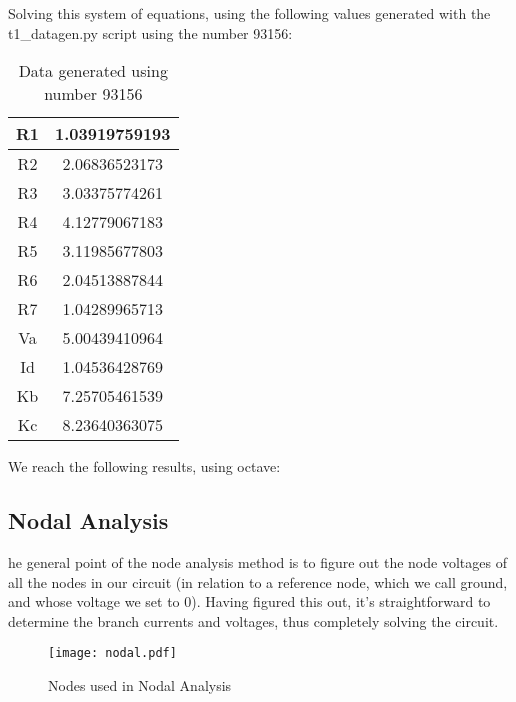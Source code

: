 \vspace{20mm}

Solving this system of equations, using the following values generated with the t1\_datagen.py script using the number 93156:


\begin{table}[H]
  \centering
  \begin{tabular}{ c c }
    R1 & 1.03919759193 \\ 
    \hline
    R2 & 2.06836523173 \\ 
    \hline
    R3 & 3.03375774261 \\ 
    \hline
    R4 & 4.12779067183 \\ 
    \hline
    R5 & 3.11985677803 \\ 
    \hline
    R6 & 2.04513887844 \\ 
    \hline
    R7 & 1.04289965713 \\ 
    \hline
    Va & 5.00439410964 \\ 
    \hline
    Id & 1.04536428769 \\ 
    \hline
    Kb & 7.25705461539 \\ 
    \hline
    Kc & 8.23640363075 \\ 
  \end{tabular}
  \caption{Data generated using number 93156}
  \label{tab:data}
\end{table}




We reach the following results, using octave:

    








\subsection{Nodal Analysis}

he general point of the node analysis method is to figure out the node voltages of all the nodes in our circuit (in relation to a reference node,
which we call ground, and whose voltage we set to 0). Having figured this out,
it's straightforward to determine the branch currents and voltages, thus completely solving the circuit. 
\par

\begin{figure}[H] \centering
  \texttt{[image: nodal.pdf]}
  \caption{Nodes used in Nodal Analysis}
  \label{fig:nodal}
\end{figure}

